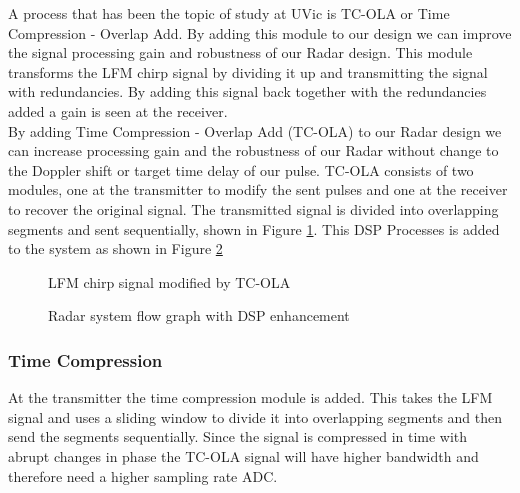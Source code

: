 \documentclass[letterpaper, 12 pt, conference]{report}
\numberwithin{figure}{section}
\begin{document}
A process that has been the topic of study at UVic is TC-OLA or Time Compression - Overlap Add. By adding this module to our design we can improve the signal processing gain and robustness of our Radar design. This module transforms the LFM chirp signal by dividing it up and transmitting the signal with redundancies. By adding this signal back together with the redundancies added a gain is seen at the receiver.\\

By adding Time Compression - Overlap Add (TC-OLA) to our Radar design we can increase processing gain and the robustness of our Radar without change to the Doppler shift or target time delay of our pulse. TC-OLA consists of two modules, one at the transmitter to modify the sent pulses and one at the receiver to recover the original signal. The transmitted signal is divided into overlapping segments and sent sequentially, shown in Figure \ref{fig:tcola}. This DSP Processes is added to the system as shown in Figure \ref{fig:tcolafg}\\
\begin{figure}[h]
\centering{}
\caption{LFM chirp signal modified by TC-OLA}
\label{fig:tcola}
\end{figure}
\begin{figure}[h]
\centering{}
\caption{Radar system flow graph with DSP enhancement}
\label{fig:tcolafg}
\end{figure}
\FloatBarrier
\subsubsection{Time Compression}
At the transmitter the time compression module is added. This takes the LFM signal and uses a sliding window to divide it into overlapping segments and then send the segments sequentially. Since the signal is compressed in time with abrupt changes in phase the TC-OLA signal will have higher bandwidth and therefore need a higher sampling rate ADC. 
\end{document}
